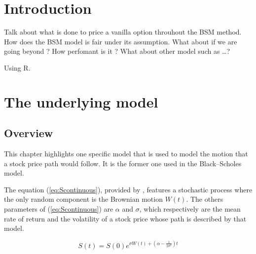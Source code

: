 \documentclass[12pt]{report}
\newcommand{\Bm}{W\left(t\right)}
\newcommand{\St}{S\left(t\right)}
\newcommand{\Si}{S\left(0\right)}
\newcommand{\Scontinuous}{\St = \Si e^{\sigma\Bm + \left(\alpha - \frac{1}{2 \sigma^2}\right)t}}
\begin{document}

\tableofcontents{}



%
%
\chapter*{Introduction}
\label{cha:Introduction}

Talk about what is done to price a vanilla option throuhout the BSM method.
How does the BSM model is fair under its assumption. What about if we are going beyond ?
How perfomant is it ? 
What about other model such as \ldots ?

Using R. \cite{R}
%
%
\chapter{The underlying model}
\label{cha:underlying}
  


\section{Overview}
\label{sec:Overview}

This chapter highlights one specific model that is used to model the motion that a stock price path would follow. It is the former one used in the Black--Scholes model.

The equation (\ref{eq:Scontinuous}), provided by \citet{shreve}, features a stochastic process where the only random component is the Brownian motion $\Bm$.
The others parameters of (\ref{eq:Scontinuous}) are $\alpha$ and $\sigma$, which respectively are the mean rate of return and the volatility of a stock price whose path is described by that model.

\begin{center}
  \begin{equation}
    \Scontinuous
    \label{eq:Scontinuous}
  \end{equation}
\end{center}
 
\end{document}
